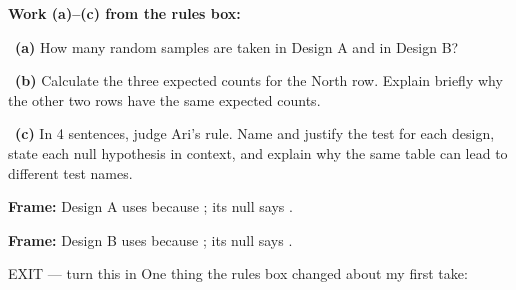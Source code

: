 \documentclass[11pt]{article}
\begin{document}
\newpage
\textbf{Work (a)--(c) from the rules box:}\par\smallskip

~\textbf{(a)} How many random samples are taken in Design A and in Design B?\par
\workspace{0.7in}

~\textbf{(b)} Calculate the three expected counts for the North row. Explain briefly why the other two rows have the same expected counts.\par
\workspace{1.4in}

~\textbf{(c)} In 4 sentences, judge Ari's rule. Name and justify the test for each design, state each null hypothesis in context, and explain why the same table can lead to different test names.\par
\workspace{2.0in}

\begin{sentenceframebox}\raggedright\textbf{Frame:} Design A uses \blank[1.4in] because \blank[1.8in]; its null says \blank[2.0in].\end{sentenceframebox}

\begin{sentenceframebox}\raggedright\textbf{Frame:} Design B uses \blank[1.4in] because \blank[1.8in]; its null says \blank[2.0in].\end{sentenceframebox}

\begin{summaryexitbox}{EXIT --- turn this in}
One thing the rules box changed about my first take: \hrulefill\par
\workspace{0.4in}
\end{summaryexitbox}
\end{document}
